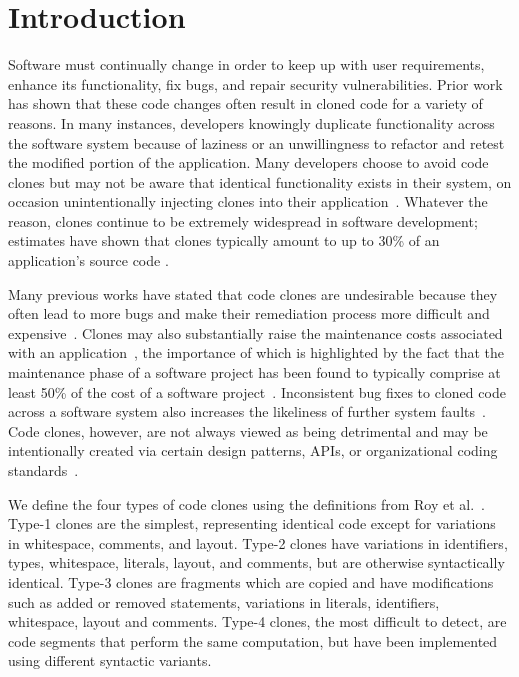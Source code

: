 \documentclass{sig-alternate}
\begin{document}
\section{Introduction}
Software must continually change in order to keep up with user requirements, enhance its functionality, fix bugs, and repair security vulnerabilities. Prior work has shown that these code changes often result in cloned code for a variety of reasons. In many instances, developers knowingly duplicate functionality across the software system because of laziness or an unwillingness to refactor and retest the modified portion of the application. Many developers choose to avoid code clones but may not be aware that identical functionality exists in their system, on occasion unintentionally injecting clones into their application~\cite{Duala-Ekoko:2010:CRD:1767751.1767754}. Whatever the reason, clones continue to be extremely widespread in software development; estimates have shown that clones typically amount to up to 30\% of an application's source code \cite{Baxter:1998:CDU:850947.853341,Kim:2005:ESC:1095430.1081737}.

Many previous works have stated that code clones are undesirable because they often lead to more bugs and make their remediation process more difficult and expensive~\cite{Duala-Ekoko:2010:CRD:1767751.1767754,Baxter:1998:CDU:850947.853341}. Clones may also substantially raise the maintenance costs associated with an application~\cite{Juergens:2009:CCM:1555001.1555062}, the importance of which is highlighted by the fact that the maintenance phase of a software project has been found to typically comprise at least 50\% of the cost of a software project~\cite{SMR:SMR225}. Inconsistent bug fixes to cloned code across a software system also increases the likeliness of further system faults~\cite{Deissenboeck_2010}. Code clones, however, are not always viewed as being detrimental and may be intentionally created via certain design patterns, APIs, or organizational coding standards~\cite{6747168}.






We define the four types of code clones using the definitions from Roy et al.~\cite{Roy:2009:CEC:1530898.1531101}. Type-1 clones are the simplest, representing identical code except for variations in whitespace, comments, and layout. Type-2 clones have variations in identifiers, types, whitespace, literals, layout, and comments, but are otherwise syntactically identical. Type-3 clones are fragments which are copied and have modifications such as added or removed statements, variations in literals, identifiers, whitespace, layout and comments. Type-4 clones, the most difficult to detect, are code segments that perform the same computation, but have been implemented using different syntactic variants.
\end{document}
